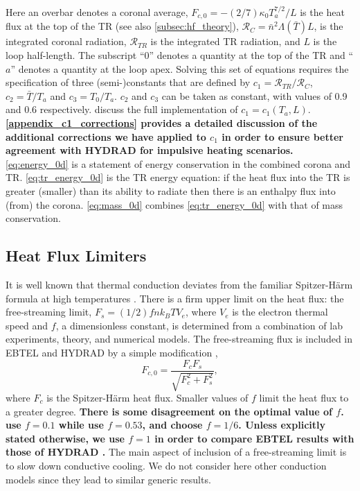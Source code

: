 \documentclass[iop]{emulateapj}
\begin{document}
Here an overbar denotes a coronal average, $F_{c,0} = -(2/7)\kappa_0 T_a^{7/2}/L$ is the heat flux at the top of the TR (see also \autoref{subsec:hf_theory}), $\mathcal{R}_C=\bar{n}^2\Lambda(\bar{T})L$, is the integrated coronal radiation, $\mathcal{R}_{TR}$ is the integrated TR radiation, and $L$ is the loop half-length. The subscript ``0'' denotes a quantity at the top of the TR and ``$a$'' denotes a quantity at the loop apex. Solving this set of equations requires the specification of three (semi-)constants that are defined by  $c_1=\mathcal{R}_{TR}/\mathcal{R}_C$, $c_2=\bar{T}/T_a$ and $c_3=T_0/T_a$. $c_2$ and $c_3$ can be taken as constant, with values of 0.9 and 0.6 respectively. \citet{cargill_enthalpy-based_2012} discuss the full implementation of $c_1 = c_1(T_a,L)$. \textbf{\autoref{appendix_c1_corrections} provides a detailed discussion of the additional corrections we have applied to $c_1$ in order to ensure better agreement with HYDRAD for impulsive heating scenarios.} \autoref{eq:energy_0d} is a statement of energy conservation in the combined corona and TR. \autoref{eq:tr_energy_0d} is the TR energy equation: if the heat flux into the TR is greater (smaller) than its ability to radiate then there is an enthalpy flux into (from) the corona. \autoref{eq:mass_0d} combines \autoref{eq:tr_energy_0d} with that of mass conservation.
	
	\subsection{Heat Flux Limiters}
	\label{subsec:hf_theory}
	\par It is well known that thermal conduction deviates from the familiar Spitzer-H{\"a}rm formula \citep{spitzer_transport_1953} at high temperatures \citep[e.g.][]{ljepojevic_heat_1989}. There is a firm upper limit on the heat flux: the free-streaming limit, $F_s=(1/2)fnk_BTV_e$, where $V_e$ is the electron thermal speed and $f$, a dimensionless constant, is determined from a combination of lab experiments, theory, and numerical models. The free-streaming flux is included in EBTEL and HYDRAD by a simple modification \citep{klimchuk_highly_2008},
	\begin{equation}
		F_{c,0} = \frac{F_cF_s}{\sqrt{F_c^2 + F_s^2}},
	\end{equation}
where $F_c$ is the Spitzer-H{\"a}rm heat flux. Smaller values of $f$ limit the heat flux to a greater degree. \textbf{There is some disagreement on the optimal value of $f$. \citet{luciani_nonlocal_1983} use $f=0.1$ while \citet{karpen_nonlocal_1987} use $f=0.53$, and \citet{patsourakos_coronal_2005} choose $f=1/6$. Unless explicitly stated otherwise, we use $f = 1$ in order to compare EBTEL results with those of HYDRAD \citep[see appendix of][]{bradshaw_influence_2013}.} The main aspect of inclusion of a free-streaming limit is to slow down conductive cooling. We do not consider here other conduction models \citep[e.g. the non-local model discussed in the coronal context by][]{karpen_nonlocal_1987,ciaravella_non-local_1991,west_lifetime_2008} since they lead to similar generic results. 
\end{document}

